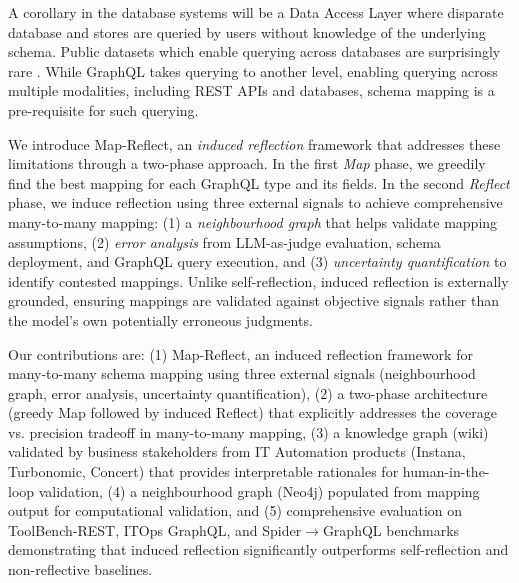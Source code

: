 \documentclass[sigconf, nonacm]{acmart}
\newcommand{\deleted}[1]{\textcolor{red}{#1}}
\begin{document}
A corollary in the database systems will be a Data Access Layer where disparate database and stores are queried by users without knowledge of the underlying schema. Public datasets which enable querying across databases are surprisingly rare \cite{wu2025wikidbgraph}. While GraphQL takes querying to another level, enabling querying across multiple modalities, including REST APIs and databases, schema mapping is a pre-requisite for such querying. 


We introduce Map-Reflect, an \emph{induced reflection} framework that addresses these limitations through a two-phase approach. In the first \emph{Map} phase, we greedily find the best mapping for each GraphQL type and its fields. In the second \emph{Reflect} phase, we induce reflection using three external signals to achieve comprehensive many-to-many mapping: (1) a \emph{neighbourhood graph} that helps validate mapping assumptions, (2) \emph{error analysis} from LLM-as-judge evaluation, schema deployment, and GraphQL query execution, and (3) \emph{uncertainty quantification} to identify contested mappings. Unlike self-reflection, induced reflection is externally grounded, ensuring mappings are validated against objective signals rather than the model's own potentially erroneous judgments.


Our contributions are: (1) Map-Reflect, an induced reflection framework for many-to-many schema mapping using three external signals (neighbourhood graph, error analysis, uncertainty quantification), (2) a two-phase architecture (greedy Map followed by induced Reflect) that explicitly addresses the coverage vs. precision tradeoff in many-to-many mapping, (3) a knowledge graph (wiki) validated by business stakeholders from IT Automation products (Instana, Turbonomic, Concert) that provides interpretable rationales for human-in-the-loop validation, (4) a neighbourhood graph (Neo4j) populated from mapping output for computational validation, and (5) comprehensive evaluation on ToolBench-REST, ITOps GraphQL, and Spider$\rightarrow$GraphQL benchmarks demonstrating that induced reflection significantly outperforms self-reflection and non-reflective baselines.
\end{document}
